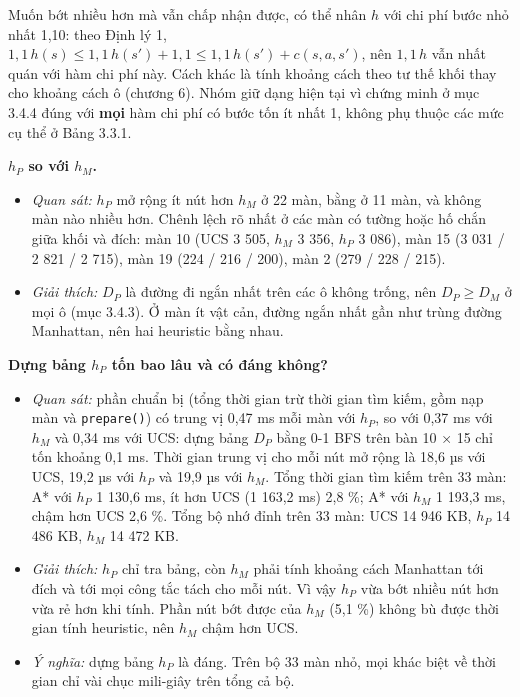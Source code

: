 Muốn bớt nhiều hơn mà vẫn chấp nhận được, có thể nhân \(h\) với chi phí bước nhỏ nhất 1,10: theo Định lý 1, \(1{,}1\,h(s) \le 1{,}1\,h(s') + 1{,}1 \le 1{,}1\,h(s') + c(s, a, s')\), nên \(1{,}1\,h\) vẫn nhất quán với hàm chi phí này. Cách khác là tính khoảng cách theo tư thế khối thay cho khoảng cách ô (chương 6). Nhóm giữ dạng hiện tại vì chứng minh ở mục 3.4.4 đúng với \textbf{mọi} hàm chi phí có bước tốn ít nhất 1, không phụ thuộc các mức cụ thể ở Bảng 3.3.1.

\textbf{\(h_P\) so với \(h_M\).}

\begin{itemize}
\tightlist
\item
  \emph{Quan sát:} \(h_P\) mở rộng ít nút hơn \(h_M\) ở 22 màn, bằng ở 11 màn, và không màn nào nhiều hơn. Chênh lệch rõ nhất ở các màn có tường hoặc hố chắn giữa khối và đích: màn 10 (UCS 3 505, \(h_M\) 3 356, \(h_P\) 3 086), màn 15 (3 031 / 2 821 / 2 715), màn 19 (224 / 216 / 200), màn 2 (279 / 228 / 215).
\item
  \emph{Giải thích:} \(D_P\) là đường đi ngắn nhất trên các ô không trống, nên \(D_P \ge D_M\) ở mọi ô (mục 3.4.3). Ở màn ít vật cản, đường ngắn nhất gần như trùng đường Manhattan, nên hai heuristic bằng nhau.
\end{itemize}

\textbf{Dựng bảng \(h_P\) tốn bao lâu và có đáng không?}

\begin{itemize}
\tightlist
\item
  \emph{Quan sát:} phần chuẩn bị (tổng thời gian trừ thời gian tìm kiếm, gồm nạp màn và \texttt{prepare()}) có trung vị 0,47 ms mỗi màn với \(h_P\), so với 0,37 ms với \(h_M\) và 0,34 ms với UCS: dựng bảng \(D_P\) bằng 0-1 BFS trên bàn 10 × 15 chỉ tốn khoảng 0,1 ms. Thời gian trung vị cho mỗi nút mở rộng là 18,6 µs với UCS, 19,2 µs với \(h_P\) và 19,9 µs với \(h_M\). Tổng thời gian tìm kiếm trên 33 màn: A* với \(h_P\) 1 130,6 ms, ít hơn UCS (1 163,2 ms) 2,8 \%; A* với \(h_M\) 1 193,3 ms, chậm hơn UCS 2,6 \%. Tổng bộ nhớ đỉnh trên 33 màn: UCS 14 946 KB, \(h_P\) 14 486 KB, \(h_M\) 14 472 KB.
\item
  \emph{Giải thích:} \(h_P\) chỉ tra bảng, còn \(h_M\) phải tính khoảng cách Manhattan tới đích và tới mọi công tắc tách cho mỗi nút. Vì vậy \(h_P\) vừa bớt nhiều nút hơn vừa rẻ hơn khi tính. Phần nút bớt được của \(h_M\) (5,1 \%) không bù được thời gian tính heuristic, nên \(h_M\) chậm hơn UCS.
\item
  \emph{Ý nghĩa:} dựng bảng \(h_P\) là đáng. Trên bộ 33 màn nhỏ, mọi khác biệt về thời gian chỉ vài chục mili-giây trên tổng cả bộ.
\end{itemize}


